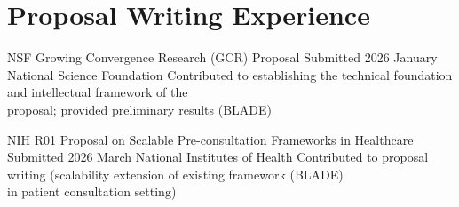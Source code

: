 \section*{Proposal Writing Experience}

\grantentry
{NSF Growing Convergence Research (GCR) Proposal}
{Submitted 2026 January}
{National Science Foundation}
{Contributed to establishing the technical foundation and intellectual framework of the \\ proposal;  provided preliminary results (BLADE)}

\grantentry
{NIH R01 Proposal on Scalable Pre-consultation Frameworks in Healthcare}
{Submitted 2026 March}
{National Institutes of Health}
{Contributed to proposal writing (scalability extension of existing framework (BLADE) \\ in patient consultation setting)}